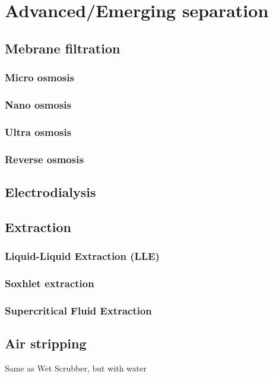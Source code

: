 \documentclass{article}
\begin{document}
\newpage
\section{Advanced/Emerging separation}

\subsection{Mebrane filtration}

\subsubsection{Micro osmosis}

\subsubsection{Nano osmosis}

\subsubsection{Ultra osmosis}

\subsubsection{Reverse osmosis}

\subsection{Electrodialysis}

\subsection{Extraction}

\subsubsection{Liquid-Liquid Extraction (LLE)}

\subsubsection{Soxhlet extraction}

\subsubsection{Supercritical Fluid Extraction}

\subsection{Air stripping}
Same as Wet Scrubber, but with water
\end{document}
